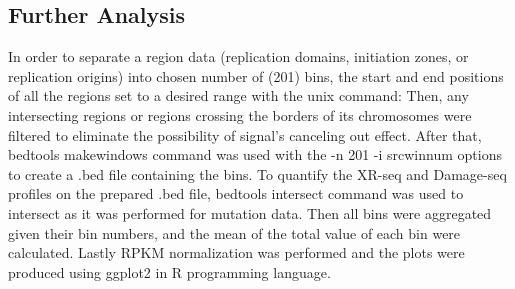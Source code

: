 \subsection{Further Analysis}
In order to separate a region data (replication domains, initiation zones, or replication origins) into chosen number of (201) bins, the start and end positions of all the regions set to a desired range with the unix command: %
Then, any intersecting regions or regions crossing the borders of its chromosomes were filtered to eliminate the possibility of signal's canceling out effect. After that, bedtools makewindows command was used with the -n 201 -i srcwinnum options to create a .bed file containing the bins.
To quantify the XR-seq and Damage-seq profiles on the prepared .bed file, bedtools intersect command was used to intersect as it was performed for mutation data. Then all bins were aggregated given their bin numbers, and the mean of the total value of each bin were calculated. Lastly RPKM normalization was performed and the plots were produced using ggplot2 in R programming language.